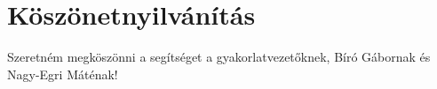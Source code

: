 \documentclass[a4paper, 12pt]{article}
\begin{document}
\section*{Köszönetnyilvánítás}
Szeretném megköszönni a segítséget a gyakorlatvezetőknek, Bíró Gábornak és Nagy-Egri Máténak!


\newpage \vspace*{2cm}


       
       
%
% 







\newpage
\end{document}
